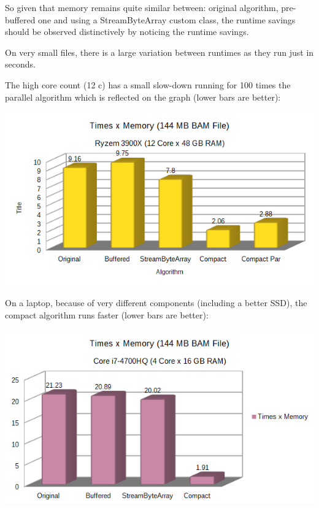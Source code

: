 \documentclass[a4paper,twoside]{article}
\begin{document}
So given that memory remains quite similar between: original algorithm, pre-buffered one and using a
StreamByteArray custom class, the runtime savings should be observed distinctively by noticing the runtime savings.

On very small files, there is a large variation between runtimes as they run just in seconds.

The high core count (12 c) has a small slow-down running for 100 times the parallel algorithm which is reflected on the graph (lower bars are better):

\begin{center}
	\includegraphics[scale=0.5]{images/times_and_memory_chart_small_144mb_ryzen.png}
\end{center}

On a laptop, because of very different components (including a better SSD), the compact algorithm 
runs faster (lower bars are better):

\begin{center}
	\includegraphics[scale=0.5]{images/times_and_memory_chart_small_144mb_intel.png}
\end{center}
\end{document}
